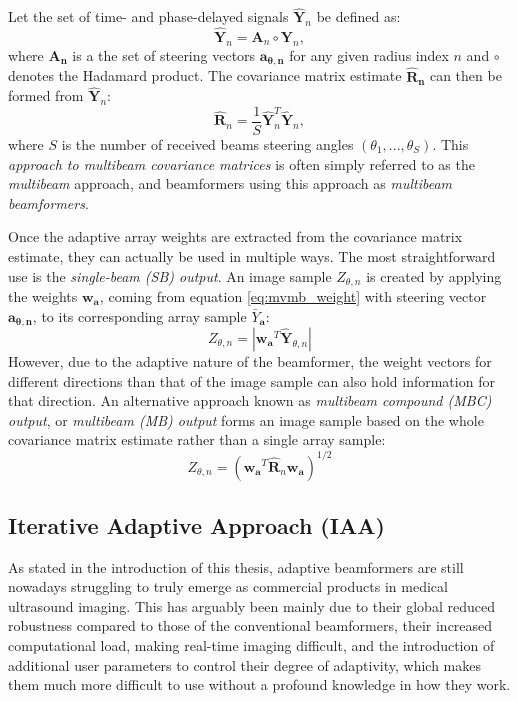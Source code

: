 Let the set of time- and phase-delayed signals $\boldsymbol{\hat{Y}}_n$ be defined as:
\begin{equation}
    \boldsymbol{\hat{Y}}_n = \boldsymbol{A}_n \circ \boldsymbol{Y}_n, 
\label{eq:time_phase_delayed}
\end{equation}
\noindent
where $\boldsymbol{A_n}$ is a the set of steering vectors $\boldsymbol{a_{\theta, n}}$ for any given radius index $n$ and $\circ$ denotes the Hadamard product.
The covariance matrix estimate $\boldsymbol{\hat{R}_n}$ can then be formed from $\boldsymbol{\hat{Y}}_n$:
\begin{equation}
    \boldsymbol{\hat{R}}_n = \frac{1}{S} \boldsymbol{\hat{Y}}_n^T \boldsymbol{\hat{Y}}_n,
\label{eq:mb_covariance}
\end{equation}
\noindent
where $S$ is the number of received beams steering angles $(\theta_1,..., \theta_S)$.
This \textit{approach to multibeam covariance matrices} is often simply referred to as the \textit{multibeam} approach, and beamformers using this approach as \textit{multibeam beamformers}.

Once the adaptive array weights are extracted from the covariance matrix estimate, they can actually be used in multiple ways. The most straightforward use is the \textit{single-beam (SB) output}. An image sample $Z_{\theta,n}$ is created by applying the weights $\boldsymbol{w}_{\boldsymbol{a}}$, coming from equation \ref{eq:mvmb_weight} with steering vector $\boldsymbol{a_{\theta,n}}$, to its corresponding array sample $\bar{Y}_{\boldsymbol{a}}$:
\begin{equation}
    Z_{\theta,n} = | \boldsymbol{w_a}^T \boldsymbol{\hat{Y}}_{\theta, n} |
\end{equation}
\noindent
However, due to the adaptive nature of the beamformer, the weight vectors for different directions than that of the image sample can also hold information for that direction.
An alternative approach known as \textit{multibeam compound (MBC) output}, or \textit{multibeam (MB) output} forms an image sample based on the whole covariance matrix estimate rather than a single array sample:
\begin{equation}
    Z_{\theta,n} = (\boldsymbol{w_a}^T \boldsymbol{\hat{R}}_n \boldsymbol{w_a})^{1/2}
\end{equation}


\subsection{Iterative Adaptive Approach (IAA)}
\label{sec:IAA}
As stated in the introduction of this thesis, adaptive beamformers are still nowadays struggling to truly emerge as commercial products in medical ultrasound imaging. This has arguably been mainly due to their global reduced robustness compared to those of the conventional beamformers, their increased computational load, making real-time imaging difficult, and the introduction of additional user parameters to control their degree of adaptivity, which makes them much more difficult to use without a profound knowledge in how they work. 

